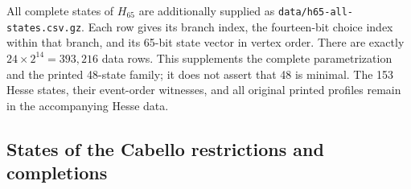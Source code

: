 \documentclass[aps,pra,reprint,superscriptaddress,longbibliography,nofootinbib,floatfix,10pt]{revtex4-2}
\theoremstyle{definition}
\begin{document}
\par
All complete states of $H_{65}$ are additionally supplied as
\texttt{data/h65-all-states.csv.gz}. Each row gives its branch index,
the fourteen-bit choice index within that branch, and its 65-bit state
vector in vertex order. There are exactly $24\times2^{14}=393{,}216$ data
rows. This supplements the complete parametrization and the printed
48-state family; it does not assert that 48 is minimal. The 153 Hesse
states, their event-order witnesses, and all original printed profiles
remain in the accompanying Hesse data.

\subsection{States of the Cabello restrictions and completions}
\end{document}
